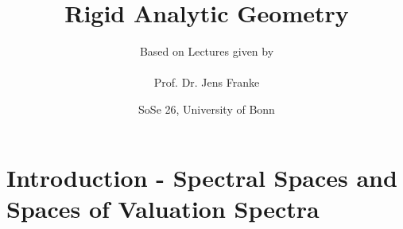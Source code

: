 \documentclass[8pt]{article}
\title{Rigid Analytic Geometry}
\author{Based on Lectures given by\\\\Prof. Dr. Jens Franke}
\date{SoSe 26, University of Bonn}
\numberwithin{equation}{section}
\newtheorem{definition}{Definition}[subsection]
\newcommand{\Ouv}{\mathscr{O}}
\newcommand{\norm}[1]{\Vert #1 \Vert}
\newcommand{\C}[0]{\mathbb{C}}
\newcommand{\sep}[0]{\:|\:}
\begin{document}
\maketitle


\section{Introduction - Spectral Spaces and Spaces of Valuation Spectra}


\end{document}
